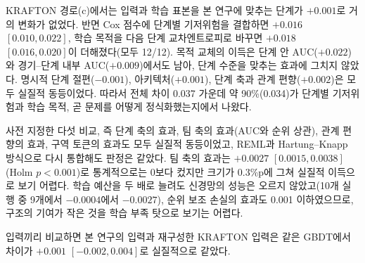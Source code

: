KRAFTON 경로(c)에서는 입력과 학습 표본을 본 연구에 맞추는 단계가 $+0.001$로 거의 변화가 없었다.
반면 Cox 점수에 단계별 기저위험을 결합하면 $+0.016$ $[0.010, 0.022]$, 학습 목적을 다음 단계 교차엔트로피로 바꾸면 $+0.018$ $[0.016, 0.020]$이 더해졌다(모두 12/12).
목적 교체의 이득은 단계 안 AUC($+0.022$)와 경기--단계 내부 AUC($+0.009$)에서도 남아, 단계 수준을 맞추는 효과에 그치지 않았다.
명시적 단계 절편($-0.001$), 아키텍처($+0.001$), 단계 축과 관계 편향($+0.002$)은 모두 실질적 동등이었다.
따라서 전체 차이 0.037 가운데 약 90\%(0.034)가 단계별 기저위험과 학습 목적, 곧 문제를 어떻게 정식화했는지에서 나왔다.

사전 지정한 다섯 비교, 즉 단계 축의 효과, 팀 축의 효과(AUC와 순위 상관), 관계 편향의 효과, 구역 토큰의 효과도 모두 실질적 동등이었고, REML과 Hartung--Knapp 방식으로 다시 통합해도 판정은 같았다.
팀 축의 효과는 $+0.0027$ $[0.0015, 0.0038]$(Holm $p<0.001$)로 통계적으로는 0보다 컸지만 크기가 0.3\%p에 그쳐 실질적 이득으로 보기 어렵다.
학습 예산을 두 배로 늘려도 신경망의 성능은 오르지 않았고(10개 실행 중 9개에서 $-0.0004$에서 $-0.0027$), 순위 보조 손실의 효과도 0.001 이하였으므로, 구조의 기여가 작은 것을 학습 부족 탓으로 보기는 어렵다.

입력끼리 비교하면 본 연구의 입력과 재구성한 KRAFTON 입력은 같은 GBDT에서 차이가 $+0.001$ $[-0.002, 0.004]$로 실질적으로 같았다.

